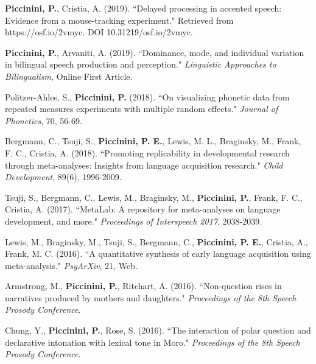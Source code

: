\documentclass[9pt]{article}
\newenvironment{changemargin}[2]{%
  \begin{list}{}{%
    \setlength{\topsep}{0pt}%
    \setlength{\leftmargin}{#1}%
    \setlength{\rightmargin}{#2}%
    \setlength{\listparindent}{\parindent}%
    \setlength{\itemindent}{\parindent}%
    \setlength{\parsep}{\parskip}%
  }%
  \item[]}{\end{list}
}
\newenvironment{body} {
	\vspace*{-16pt}
	\begin{changemargin}{-0.25in}{-0.5in}
  }	
	{\end{changemargin}
}
\begin{document}
\begin{body}
	\vspace{14pt}
	
	\textbf{Piccinini, P.}, Cristia, A. (2019). ``Delayed processing in accented speech: Evidence from a mouse-tracking experiment." Retrieved from https://osf.io/2vmyc. DOI 10.31219/osf.io/2vmyc.\\
	\medskip
	
	\textbf{Piccinini, P.}, Arvaniti, A. (2019). ``Dominance, mode, and individual variation in bilingual speech production and perception." \emph{Linguistic Approaches to Bilingualism}, Online First Article.\\
	\medskip
	
	Politzer-Ahles, S., \textbf{Piccinini, P.} (2018). ``On visualizing phonetic data from repeated measures experiments with multiple random effects." \emph{Journal of Phonetics}, 70, 56-69.\\
	\medskip
	
	Bergmann, C., Tsuji, S., \textbf{Piccinini, P. E.},  Lewis, M. L.,  Braginsky, M., Frank, F. C., Cristia, A. (2018). ``Promoting replicability in developmental research through meta-analyses: Insights from language acquisition research." \emph{Child Development}, 89(6), 1996-2009.\\
	\medskip
	
	Tsuji, S., Bergmann, C., Lewis, M.,  Braginsky, M.,  \textbf{Piccinini, P.},  Frank, F. C., Cristia, A. (2017). ``MetaLab: A repository for meta-analyses on language development, and more." 	\emph{Proceedings of Interspeech 2017}, 2038-2039.\\
	\medskip
	
	Lewis, M., Braginsky, M., Tsuji, S., Bergmann, C., \textbf{Piccinini, P. E.}, Cristia, A., Frank, M. C. (2016). ``A quantitative synthesis of early language acquisition using meta-analysis." \emph{PsyArXiv}, 21, Web.\\
	\medskip
		
	Armstrong, M., \textbf{Piccinini, P.}, Ritchart, A. (2016). ``Non-question rises in narratives produced by mothers and daughters." \emph{Proceedings of the 8th Speech Prosody Conference}.\\
	\medskip
	
	Chung, Y., \textbf{Piccinini, P.}, Rose, S. (2016). ``The interaction of polar question and declarative intonation with lexical tone in Moro." \emph{Proceedings of the 8th Speech Prosody Conference}.\\
	\medskip


\end{body}
\end{document}
